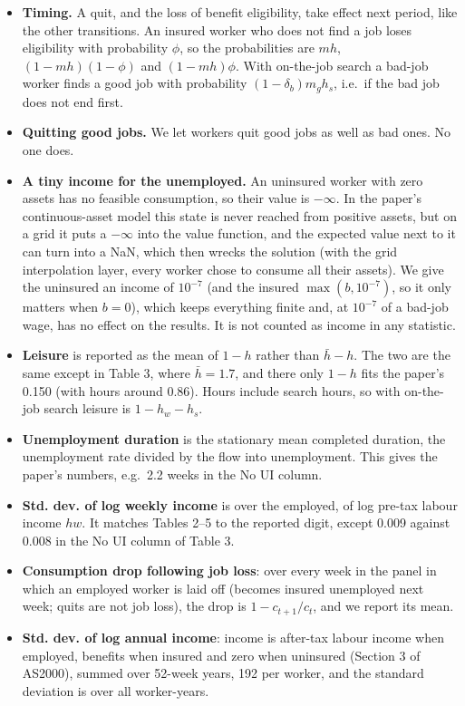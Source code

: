 \documentclass[11pt,fleqn]{article}
\begin{document}
\begin{itemize}
 \item \textbf{Timing.} A quit, and the loss of benefit eligibility, take effect next period, like the other transitions. An insured worker who does not find a job loses eligibility with probability $\phi$, so the probabilities are $m h$, $(1-mh)(1-\phi)$ and $(1-mh)\phi$. With on-the-job search a bad-job worker finds a good job with probability $(1-\delta_b)m_g h_s$, i.e.\ if the bad job does not end first.
 \item \textbf{Quitting good jobs.} We let workers quit good jobs as well as bad ones. No one does.
 \item \textbf{A tiny income for the unemployed.} An uninsured worker with zero assets has no feasible consumption, so their value is $-\infty$. In the paper's continuous-asset model this state is never reached from positive assets, but on a grid it puts a $-\infty$ into the value function, and the expected value next to it can turn into a NaN, which then wrecks the solution (with the grid interpolation layer, every worker chose to consume all their assets). We give the uninsured an income of $10^{-7}$ (and the insured $\max(b,10^{-7})$, so it only matters when $b=0$), which keeps everything finite and, at $10^{-7}$ of a bad-job wage, has no effect on the results. It is not counted as income in any statistic.
 \item \textbf{Leisure} is reported as the mean of $1-h$ rather than $\bar{h}-h$. The two are the same except in Table 3, where $\bar{h}=1.7$, and there only $1-h$ fits the paper's 0.150 (with hours around 0.86). Hours include search hours, so with on-the-job search leisure is $1-h_w-h_s$.
 \item \textbf{Unemployment duration} is the stationary mean completed duration, the unemployment rate divided by the flow into unemployment. This gives the paper's numbers, e.g.\ 2.2 weeks in the No UI column.
 \item \textbf{Std. dev. of log weekly income} is over the employed, of log pre-tax labour income $hw$. It matches Tables 2--5 to the reported digit, except 0.009 against 0.008 in the No UI column of Table 3.
 \item \textbf{Consumption drop following job loss}: over every week in the panel in which an employed worker is laid off (becomes insured unemployed next week; quits are not job loss), the drop is $1-c_{t+1}/c_t$, and we report its mean.
 \item \textbf{Std. dev. of log annual income}: income is after-tax labour income when employed, benefits when insured and zero when uninsured (Section 3 of AS2000), summed over 52-week years, 192 per worker, and the standard deviation is over all worker-years.

\end{itemize}
\end{document}
